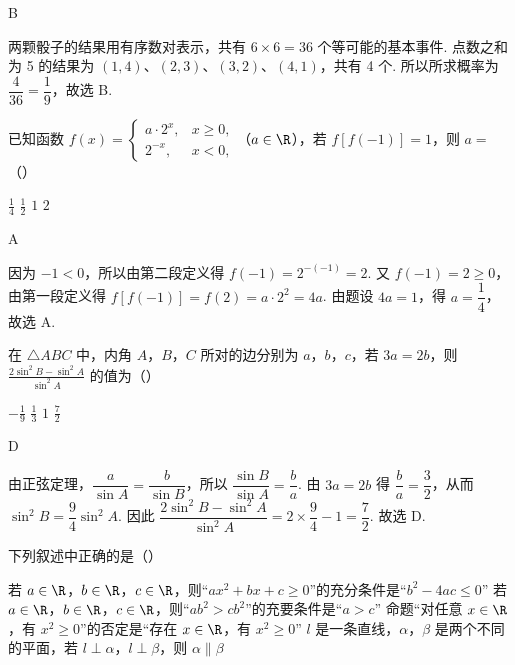 \begin{answer}
B
\end{answer}

\begin{solution}
两颗骰子的结果用有序数对表示，共有 \(6\times6=36\) 个等可能的基本事件. 点数之和为 5 的结果为 \((1,4)\)、\((2,3)\)、\((3,2)\)、\((4,1)\)，共有 4 个. 所以所求概率为 \(\dfrac{4}{36}=\dfrac{1}{9}\)，故选 B.
\end{solution}

\begin{problem}
已知函数 \(f(x) = \begin{cases}
a \cdot 2^x, & x \geqslant 0,\\
2^{-x}, & x < 0,
\end{cases}\)（\(a \in \R\)），若 \( f[f(-1)] = 1 \)，则 \( a =\)（\quad）

\choices
    {\( \frac{1}{4} \)}
    {\( \frac{1}{2} \)}
    {\(1\)}
    {\(2\)}
\end{problem}

\begin{answer}
A
\end{answer}

\begin{solution}
因为 \(-1<0\)，所以由第二段定义得 \(f(-1)=2^{-(-1)}=2\). 又 \(f(-1)=2\geqslant0\)，由第一段定义得 \(f[f(-1)]=f(2)=a\cdot2^2=4a\). 由题设 \(4a=1\)，得 \(a=\dfrac14\)，故选 A.
\end{solution}

\begin{problem}
在 \(\triangle ABC\) 中，内角 \(A\)，\(B\)，\(C\) 所对的边分别为 \(a\)，\(b\)，\(c\)，若 \(3a = 2b\)，则 \(\frac{2\sin^2 B - \sin^2 A}{\sin^2 A}\) 的值为（\quad）

\choices
    {\(-\frac{1}{9}\)}
    {\( \frac{1}{3} \)}
    {\(1\)}
    {\( \frac{7}{2} \)}
\end{problem}

\begin{answer}
D
\end{answer}

\begin{solution}
由正弦定理，\(\dfrac{a}{\sin A}=\dfrac{b}{\sin B}\)，所以 \(\dfrac{\sin B}{\sin A}=\dfrac{b}{a}\). 由 \(3a=2b\) 得 \(\dfrac{b}{a}=\dfrac32\)，从而 \(\sin^2B=\dfrac94\sin^2A\). 因此
\(\dfrac{2\sin^2B-\sin^2A}{\sin^2A}=2\times\dfrac94-1=\dfrac72\). 故选 D.
\end{solution}

\begin{problem}
下列叙述中正确的是（\quad）

\choices
    {若 \(a\in\R\)，\(b\in\R\)，\(c\in\R\)，则“\(ax^2 + bx + c \geqslant 0\)”的充分条件是“\(b^2 - 4ac \leqslant 0\)”}
    {若 \(a\in\R\)，\(b\in\R\)，\(c\in\R\)，则“\(ab^2 > cb^2\)”的充要条件是“\(a > c\)”}
    {命题“对任意 \(x \in \R\)，有 \(x^2 \geqslant 0\)”的否定是“存在 \(x \in \R\)，有 \(x^2 \geqslant 0\)”}
    {\(l\) 是一条直线，\(\alpha\)，\(\beta\) 是两个不同的平面，若 \(l \perp \alpha\)，\(l \perp \beta\)，则 \(\alpha \parallel \beta\)}
\end{problem}

